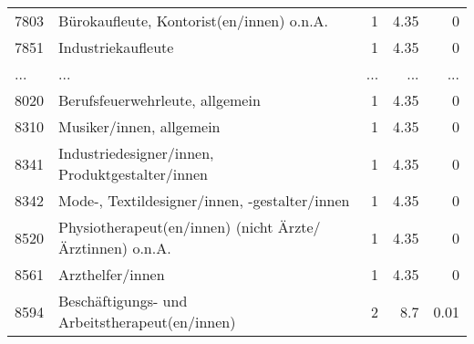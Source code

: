 \begin{longtable}{lXrrr}
        7803 & \multicolumn{1}{X}{Bürokaufleute, Kontorist(en/innen) o.n.A.} & %
          \num{1} &
          \num[round-mode=places,round-precision=2]{4.35} &
          \num[round-mode=places,round-precision=2]{0} \\
        7851 & \multicolumn{1}{X}{Industriekaufleute} & %
          \num{1} &
          \num[round-mode=places,round-precision=2]{4.35} &
          \num[round-mode=places,round-precision=2]{0} \\
       ... & ... & ... & ... & ... \\
        8020 & \multicolumn{1}{X}{Berufsfeuerwehrleute, allgemein} & %
          \num{1} &
          \num[round-mode=places,round-precision=2]{4.35} &
          \num[round-mode=places,round-precision=2]{0} \\

        8310 & \multicolumn{1}{X}{Musiker/innen, allgemein} & %
          \num{1} &
          \num[round-mode=places,round-precision=2]{4.35} &
          \num[round-mode=places,round-precision=2]{0} \\

        8341 & \multicolumn{1}{X}{Industriedesigner/innen, Produktgestalter/innen} & %
          \num{1} &
          \num[round-mode=places,round-precision=2]{4.35} &
          \num[round-mode=places,round-precision=2]{0} \\

        8342 & \multicolumn{1}{X}{Mode-, Textildesigner/innen, -gestalter/innen} & %
          \num{1} &
          \num[round-mode=places,round-precision=2]{4.35} &
          \num[round-mode=places,round-precision=2]{0} \\

        8520 & \multicolumn{1}{X}{Physiotherapeut(en/innen) (nicht Ärzte/Ärztinnen) o.n.A.} & %
          \num{1} &
          \num[round-mode=places,round-precision=2]{4.35} &
          \num[round-mode=places,round-precision=2]{0} \\

        8561 & \multicolumn{1}{X}{Arzthelfer/innen} & %
          \num{1} &
          \num[round-mode=places,round-precision=2]{4.35} &
          \num[round-mode=places,round-precision=2]{0} \\

        8594 & \multicolumn{1}{X}{Beschäftigungs- und Arbeitstherapeut(en/innen)} & %
          \num{2} &
          \num[round-mode=places,round-precision=2]{8.7} &
          \num[round-mode=places,round-precision=2]{0.01} \\


\end{longtable}
